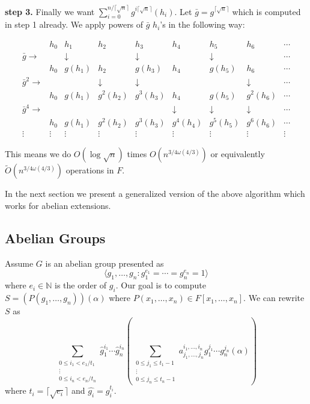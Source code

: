 \documentclass[sigconf]{acmart}
\newcommand{\osumcost}{O(n^{3/4 \omega(4/3)})}
\newcommand{\osumcosttilde}{\tilde{O}(n^{3/4 \omega(4/3)})}
\theoremstyle{acmplain}
\begin{document}
\textbf{step 3.} Finally we want $\sum_{i = 0}^{n/\lceil \sqrt{n} \rceil} g^{i\lceil \sqrt{n} \rceil}(h_i)$. Let
$\bar{g} = g^{\lceil \sqrt{n} \rceil}$ which is computed in step 1 already. We apply powers of $\bar{g}$ $h_i$'s in
the following way: 
\begin{footnotesize}
$$
\begin{array}{lllllllll}
&h_0 & h_1 & h_2 & h_3 & h_4 & h_5 & h_6 &  \cdots \\
\bar{g} \rightarrow &	& \downarrow & & \downarrow & & \downarrow & &  \cdots \\
&h_0 & g(h_1) & h_2 & g(h_3) & h_4 & g(h_5) & h_6 &  \cdots \\	
\bar{g}^2 \rightarrow &	&  & \downarrow& \downarrow & &  &\downarrow &  \cdots \\
&h_0 & g(h_1) & g^2(h_2) & g^3(h_3) & h_4 & g(h_5) & g^2(h_6) & \cdots \\	
\bar{g}^4 \rightarrow&	&  & &  & \downarrow& \downarrow &\downarrow & \cdots \\
&h_0 & g(h_1) & g^2(h_2) & g^3(h_3) & g^4(h_4) & g^5(h_5) & g^6(h_6) &  \cdots \\		
\vdots & \vdots & \vdots & \vdots & \vdots & \vdots & \vdots & \vdots & \vdots 
\end{array}
$$
\end{footnotesize}
This means we do $O(\log \sqrt{n})$ times $\osumcost$ or equivalently $\osumcosttilde$ operations in $F$. 

In the next section
we present a generalized version of the above algorithm which works for abelian extensions.

\subsection{Abelian Groups}
Assume $G$ is an abelian group presented as 
$$ \langle g_1, \ldots , g_n: g_{1}^{e_1} = \cdots = g_{n}^{e_n} = 1 \rangle$$
 where $ e_i \in \mathbb{N}$
is the order of $g_i$. Our goal is to compute $S = (P(g_1,  \ldots, g_n))(\alpha)$ where $P(x_1, \ldots,x_n) \in F[x_1, \dots , x_n].$
We can rewrite $S$ as 
$$\sum_{\substack{0 \leq i_1 < e_1/t_1 \\ \vdots \\ 0 \leq i_n < e_n/t_n}} \hat{g}_1^{i_1} \cdots \hat{g}_n^{i_n}(\sum_{\substack{0 \leq j_1 \leq t_1-1\\ \vdots \\ 0 \leq j_n \leq t_n-1}} a^{i_1, \ldots , i_n}_{j_1, \ldots , j_n}g_1^{j_1}\cdots g_n^{j_n}(\alpha))$$
where $t_i = \lceil \sqrt{e_i}\rceil$ and $\hat{g_i} = g_i^{t_i}.$
\end{document}
